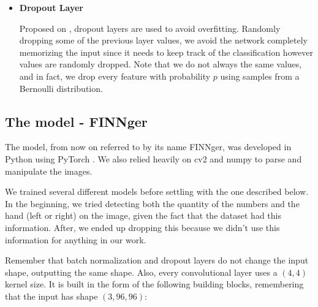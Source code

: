 \documentclass[conference]{IEEEtran}
\begin{document}
\begin{itemize}
\item \textbf{Dropout Layer}

Proposed on \cite{b6}, dropout layers are used to avoid overfitting. Randomly dropping some of the previous layer values, we avoid the network completely memorizing the input since it needs to keep track of the classification however values are randomly dropped. Note that we do not always the same values, and in fact, we drop every feature with probability $p$ using samples from a Bernoulli distribution.

\end{itemize}

\subsection{The model - FINNger}

The model, from now on referred to by its name FINNger, was developed in Python using PyTorch \cite{pytorch_paper}\cite{pytorch_website}. We also relied heavily on cv2\cite{cv2} and numpy\cite{numpy} to parse and manipulate the images.

We trained several different models before settling with the one described below. In the beginning, we tried detecting both the quantity of the numbers and the hand (left or right) on the image, given the fact that the dataset had this information. After, we ended up dropping this because we didn't use this information for anything in our work.

Remember that batch normalization and dropout layers do not change the input shape, outputting the same shape. Also, every convolutional layer uses a $(4,4)$ kernel size. It is built in the form of the following building blocks, remembering that the input has shape $(3,96,96)$:
\end{document}
